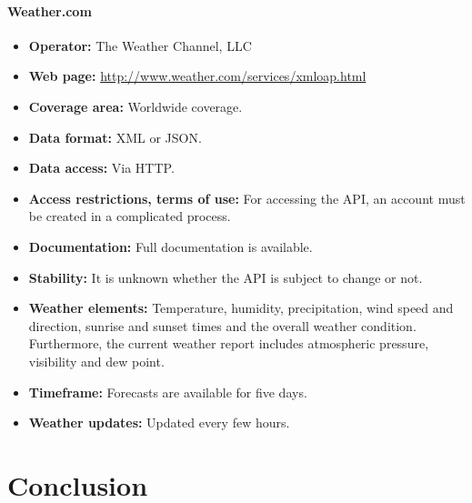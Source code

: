 \paragraph{Weather.com}

\begin{itemize}
  \item \textbf{Operator:} The Weather Channel, LLC
  \item \textbf{Web page:} \href{http://www.weather.com/services/xmloap.html}{http://www.weather.com/services/xmloap.html}
  \item \textbf{Coverage area:} Worldwide coverage.
  \item \textbf{Data format:} XML or JSON.
  \item \textbf{Data access:} Via HTTP.
  \item \textbf{Access restrictions, terms of use:} For accessing the API, an account must be created in a complicated process. 
  \item \textbf{Documentation:} Full documentation is available.
  \item \textbf{Stability:} It is unknown whether the API is subject to change or not.
  \item \textbf{Weather elements:} Temperature, humidity, precipitation, wind speed and direction, sunrise and sunset times and the overall weather condition. Furthermore, the current weather report includes atmospheric pressure, visibility and dew point.
  \item \textbf{Timeframe:} Forecasts are available for five days.
  \item \textbf{Weather updates:} Updated every few hours.
\end{itemize}

\section{Conclusion}
\label{sec:weather_conclusion}


